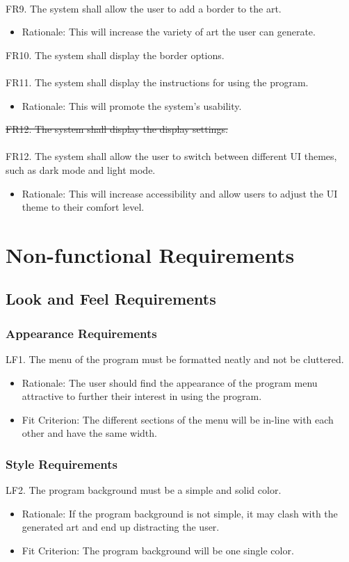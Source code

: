 \documentclass[12pt, titlepage]{article}
\begin{document}
\\
FR9. The system shall allow the user to add a border to the art.
\begin{itemize}
    \item Rationale: This will increase the variety of art the user can generate.
\end{itemize}
FR10. The system shall display the border options.\\
\\
\color{red}FR11. The system shall display the instructions for using the program.
\begin{itemize}
    \item Rationale: This will promote the system's usability.
\end{itemize}\color{black}
\st{FR12. The system shall display the display settings.}\\
\\
FR12. The system shall allow the user to switch between different UI themes, such as dark mode and light mode.
\begin{itemize}
    \item Rationale: This will increase accessibility and allow users to adjust the UI theme to their comfort level.
\end{itemize}

\section{Non-functional Requirements}

\subsection{Look and Feel Requirements}

\subsubsection{Appearance Requirements}
LF1. The menu of the program must be formatted neatly and not be cluttered.
\begin{itemize}
    \item Rationale: The user should find the appearance of the program menu attractive to further their interest in using the program.
    \item \color{red} Fit Criterion: The different sections of the menu will be in-line with each other and have the same width. \color{black}
\end{itemize}
\subsubsection{Style Requirements}
LF2. The program background must be a simple and solid color.
\begin{itemize}
    \item Rationale: If the program background is not simple, it may clash with the generated art and end up distracting the user.
    \item \color{red} Fit Criterion: The program background will be one single color. \color{black}
\end{itemize}
\end{document}
